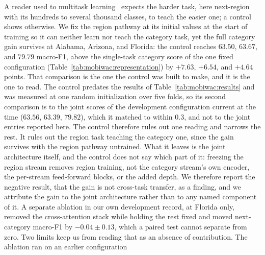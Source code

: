 A reader used to multitask learning~\cite{caruana1997multitask} expects the
harder task, here next-region with its hundreds to several thousand classes, to teach the easier one; a control shows otherwise. We fix the region pathway at its initial values at the start of training so it can neither learn nor teach the category task, yet the full category gain survives at Alabama, Arizona, and
Florida: the control reaches $63.50$, $63.67$, and $79.79$ macro-F1, above the
single-task category score of the one fixed configuration
(Table~\ref{tab:mobiwac:representation}) by $+7.63$, $+6.54$, and $+4.64$
points. That comparison is the one the control was built to make, and it is the
one to read. The control predates the results of
Table~\ref{tab:mobiwac:results} and was measured at one random initialization
over five folds, so its second comparison is to the joint scores of the
development configuration current at the time ($63.56$, $63.39$, $79.82$), which
it matched to within $0.3$, and not to the joint entries reported here. The control therefore rules out one reading and narrows the rest. It rules out the region task
teaching the category one, since the gain survives with the region pathway untrained. What it leaves
is the joint architecture itself, and the control does not say which part of it: freezing the region
stream removes region training, not the category stream's own encoder, the per-stream feed-forward
blocks, or the added depth. We therefore report the negative result, that the gain is not cross-task
transfer, as a finding, and we attribute the gain to the joint architecture rather than to any named
component of it. A separate ablation in our own development record, at Florida only, removed the
cross-attention stack while holding the rest fixed and moved next-category macro-F1 by
$-0.04 \pm 0.13$, which a paired test cannot separate from zero. Two limits keep us from
reading that as an absence of contribution. The ablation ran on an earlier configuration
